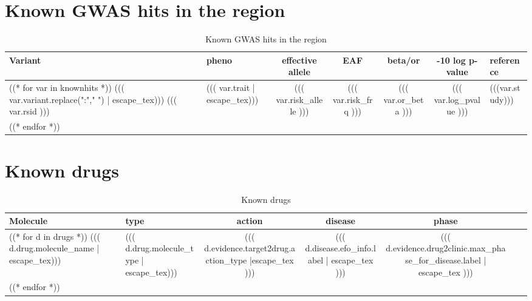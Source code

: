 \documentclass{article}
\begin{document}
\newpage

\section{ Known GWAS hits in the region}
\begin{longtable}{ >{\RaggedRight}p{3cm}|L{3cm}|c|c|c|c|>{\RaggedRight}p{3cm} }
\caption{ Known GWAS hits in the region }\\
Variant & pheno & effective allele & EAF & beta/or & -10 log p-value & reference \\
\hline
((* for var in knownhits *))
((( var.variant.replace(":"," ") | escape_tex))) \newline ((( var.rsid ))) & ((( var.trait | escape_tex))) & ((( var.risk_allele ))) & ((( var.risk_frq ))) & ((( var.or_beta ))) & ((( var.log_pvalue ))) & (((var.study))) \\
((* endfor *))
\end{longtable}



\newpage

\section{ Known drugs }
\begin{longtable}{ >{\RaggedRight}p{3cm}|L{3cm}|c|c|c|c|>{\RaggedRight}p{3cm} }
\caption{ Known drugs }\\
Molecule & type & action & disease & phase \\
\hline
((* for d in drugs *))
((( d.drug.molecule_name | escape_tex))) & ((( d.drug.molecule_type | escape_tex))) & ((( d.evidence.target2drug.action_type |escape_tex ))) & ((( d.disease.efo_info.label | escape_tex ))) & ((( d.evidence.drug2clinic.max_phase_for_disease.label | escape_tex ))) \\
((* endfor *))
\end{longtable}
\endgroup
\end{document}
